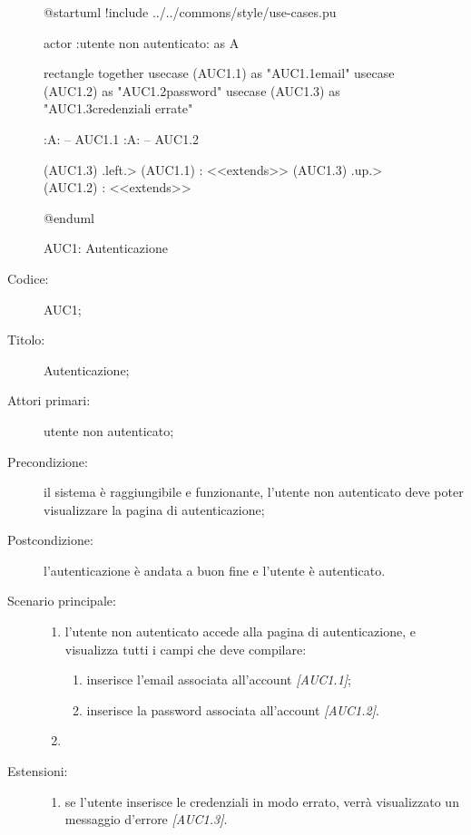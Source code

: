 \documentclass[../../../analisi-dei-requisiti.tex]{subfiles}
\begin{document}
\begin{figure}[H]
  \centering
  \begin{plantuml}
  @startuml
  !include ../../commons/style/use-cases.pu

  actor :utente non autenticato: as A

  rectangle {
    together {
    usecase (AUC1.1) as "AUC1.1\nInserimento email"
    usecase (AUC1.2) as "AUC1.2\nInserimento password"
    }
    usecase (AUC1.3) as "AUC1.3\nVisualizzazione credenziali errate"
  }

  :A: -- AUC1.1
  :A: -- AUC1.2

  (AUC1.3) .left.> (AUC1.1) : <<extends>>
  (AUC1.3) .up.> (AUC1.2) : <<extends>>

  @enduml
  \end{plantuml}
  \caption{AUC1: Autenticazione}%
  \label{fig:auc1}
\end{figure}

\begin{description}
  \item[Codice:] AUC1;
  \item[Titolo:] Autenticazione;
  \item[Attori primari:] utente non autenticato;
  \item[Precondizione:] il sistema è raggiungibile e funzionante, l'utente non autenticato deve poter visualizzare la pagina di autenticazione;
  \item[Postcondizione:] l'autenticazione è andata a buon fine e l'utente è autenticato.
  \item[Scenario principale:]
  \begin{enumerate}
    \item l'utente non autenticato accede alla pagina di autenticazione, e visualizza tutti i campi che deve compilare:
    \begin{enumerate}
      \item inserisce l’email associata all’account \emph{[AUC1.1]};
      \item inserisce la password associata all’account \emph{[AUC1.2]}.
    \end{enumerate}
    \item
  \end{enumerate}
  \item[Estensioni:]
  \begin{enumerate}
    \item se l'utente inserisce le credenziali in modo errato, verrà visualizzato un messaggio d'errore \emph{[AUC1.3]}.
  \end{enumerate}
\end{description}
\end{document}
